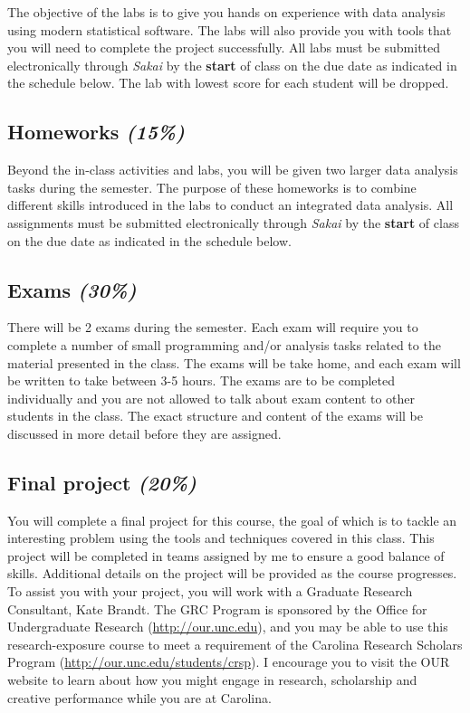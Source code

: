 \documentclass[11pt,]{article}
\begin{document}
The objective of the labs is to give you hands on experience with data
analysis using modern statistical software. The labs will also provide
you with tools that you will need to complete the project successfully.
All labs must be submitted electronically through \emph{Sakai} by the
\textbf{start} of class on the due date as indicated in the schedule
below. The lab with lowest score for each student will be dropped.

\hypertarget{homeworks-15}{%
\subsection{\texorpdfstring{Homeworks
\emph{(15\%)}}{Homeworks (15\%)}}\label{homeworks-15}}

Beyond the in-class activities and labs, you will be given two larger
data analysis tasks during the semester. The purpose of these homeworks
is to combine different skills introduced in the labs to conduct an
integrated data analysis. All assignments must be submitted
electronically through \emph{Sakai} by the \textbf{start} of class on
the due date as indicated in the schedule below.

\hypertarget{exams-30}{%
\subsection{\texorpdfstring{Exams
\emph{(30\%)}}{Exams (30\%)}}\label{exams-30}}

There will be 2 exams during the semester. Each exam will require you to
complete a number of small programming and/or analysis tasks related to
the material presented in the class. The exams will be take home, and
each exam will be written to take between 3-5 hours. The exams are to be
completed individually and you are not allowed to talk about exam
content to other students in the class. The exact structure and content
of the exams will be discussed in more detail before they are assigned.

\hypertarget{final-project-20}{%
\subsection{\texorpdfstring{Final project
\emph{(20\%)}}{Final project (20\%)}}\label{final-project-20}}

You will complete a final project for this course, the goal of which is
to tackle an interesting problem using the tools and techniques covered
in this class. This project will be completed in teams assigned by me to
ensure a good balance of skills. Additional details on the project will
be provided as the course progresses. To assist you with your project,
you will work with a Graduate Research Consultant, Kate Brandt. The GRC
Program is sponsored by the Office for Undergraduate Research
(\url{http://our.unc.edu}), and you may be able to use this
research-exposure course to meet a requirement of the Carolina Research
Scholars Program (\url{http://our.unc.edu/students/crsp}). I encourage
you to visit the OUR website to learn about how you might engage in
research, scholarship and creative performance while you are at
Carolina.
\end{document}
